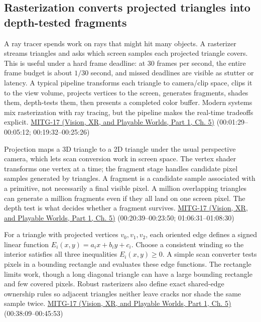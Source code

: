 \subsection{Rasterization converts projected triangles into depth-tested fragments}\label{03-visual-computing-i-ch015-rasterization-converts-projected-triangles-into-depth-tested-fragments}

\hypertarget{03-visual-computing-i-ch015-rasterization-converts-projected-triangles-into-depth-tested-fragments}{}

A ray tracer spends work on rays that might hit many objects. A rasterizer streams triangles and asks which screen samples each projected triangle covers. This is useful under a hard frame deadline: at 30 frames per second, the entire frame budget is about \(1/30\) second, and missed deadlines are visible as stutter or latency. A typical pipeline transforms each triangle to camera/clip space, clips it to the view volume, projects vertices to the screen, generates fragments, shades them, depth-tests them, then presents a completed color buffer. Modern systems mix rasterization with ray tracing, but the pipeline makes the real-time tradeoffs explicit. \href{../07-Vision-XR-and-Playable-Worlds-P01/main.pdf\#nameddest=04-visual-computing-ii-ch036-mitg-17---rasterization}{MITG-17 (Vision, XR, and Playable Worlds, Part 1, Ch. 5)} (00:01:29--00:05:12; 00:19:32--00:25:26)

Projection maps a 3D triangle to a 2D triangle under the usual perspective camera, which lets scan conversion work in screen space. The vertex shader transforms one vertex at a time; the fragment stage handles candidate pixel samples generated by triangles. A fragment is a candidate sample associated with a primitive, not necessarily a final visible pixel. A million overlapping triangles can generate a million fragments even if they all land on one screen pixel. The depth test is what decides whether a fragment survives. \href{../07-Vision-XR-and-Playable-Worlds-P01/main.pdf\#nameddest=04-visual-computing-ii-ch036-mitg-17---rasterization}{MITG-17 (Vision, XR, and Playable Worlds, Part 1, Ch. 5)} (00:20:39--00:23:50; 01:06:31--01:08:30)

For a triangle with projected vertices \(v_0,v_1,v_2\), each oriented edge defines a signed linear function \(E_i(x,y)=a_i x+b_i y+c_i\). Choose a consistent winding so the interior satisfies all three inequalities \(E_i(x,y)\ge 0\). A simple scan converter tests pixels in a bounding rectangle and evaluates these edge functions. The rectangle limits work, though a long diagonal triangle can have a large bounding rectangle and few covered pixels. Robust rasterizers also define exact shared-edge ownership rules so adjacent triangles neither leave cracks nor shade the same sample twice. \href{../07-Vision-XR-and-Playable-Worlds-P01/main.pdf\#nameddest=04-visual-computing-ii-ch036-mitg-17---rasterization}{MITG-17 (Vision, XR, and Playable Worlds, Part 1, Ch. 5)} (00:38:09--00:45:53)

